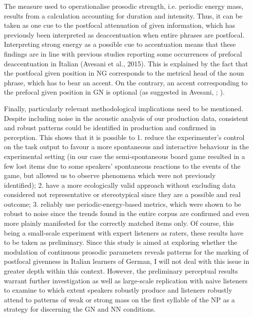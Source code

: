 The measure used to operationalise prosodic strength, i.e. periodic energy mass, results from a calculation accounting for duration and intensity. Thus, it can be taken as one cue to the postfocal attenuation of given information, which has previously been interpreted as deaccentuation when entire phrases are postfocal. Interpreting strong energy as a possible cue to accentuation means that these findings are in line with previous studies reporting some occurrences of prefocal deaccentuation in Italian (Avesani et al., 2015). This is explained by the fact that the postfocal given position in NG corresponds to the metrical head of the noun phrase, which has to bear an accent. On the contrary, an accent corresponding to the prefocal given position in GN is optional (as suggested in Avesani, \citealt{BocciVayra2015}; \citealt{BocciAvesani2011}).

Finally, particularly relevant methodological implications need to be mentioned. Despite including noise in the acoustic analysis of our production data, consistent and robust patterns could be identified in production and confirmed in perception. This shows that it is possible to 1. reduce the experimenter’s control on the task output to favour a more spontaneous and interactive behaviour in the experimental setting (in our case the semi-spontaneous board game resulted in a few lost items due to some speakers’ spontaneous reactions to the events of the game, but allowed us to observe phenomena which were not previously identified); 2. have a more ecologically valid approach without excluding data considered not representative or stereotypical since they are a possible and real outcome; 3. reliably use periodic-energy-based metrics, which were shown to be robust to noise since the trends found in the entire corpus are confirmed and even more plainly manifested for the correctly matched items only. Of course, this being a small-scale experiment with expert listeners as raters, these results have to be taken as preliminary. Since this study is aimed at exploring whether the modulation of continuous prosodic parameters reveals patterns for the marking of postfocal givenness in Italian learners of German, I will not deal with this issue in greater depth within this context. However, the preliminary perceptual results warrant further investigation as well as large-scale replication with naive listeners to examine to which extent speakers robustly produce and listeners robustly attend to patterns of weak or strong mass on the first syllable of the NP as a strategy for discerning the GN and NN conditions.

